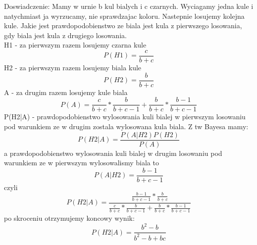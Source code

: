 \medskip
{} 
\medskip

Doswiadczenie: Mamy w urnie b kul bialych i c czarnych. Wyciagamy jedna kule i natychmiast ja wyrzucamy, nie sprawdzajac koloru. Nastepnie losujemy kolejna kule. Jakie jest prawdopodobienstwo ze biala jest kula z pierwszego losowania, gdy biala jest kula z drugiego losowania.  
$$
$$
H1 - za pierwszym razem losujemy czarna kule
$$
P(H1) = \frac{c}{b+c}
$$
H2 - za pierwszym razem losujemy biala kule
$$
P(H2) = \frac{b}{b+c}
$$
A -  za drugim razem losujemy kule biala
$$
P(A) = \frac{c}{b+c}*\frac{b}{b+c-1} + \frac{b}{b+c}*\frac{b-1}{b+c-1}
$$
P(H2|A) - prawdopodobienstwo wylosowania kuli bialej w pierwszym losowaniu pod warunkiem ze w drugim zostala wylosowana kula biala.
Z tw Bayesa mamy:
$$
P(H2|A) = \frac{P(A|H2)P(H2)}{P(A)}
$$
a prawdopodobienstwo wylosowania kuli bialej w drugim losowaniu pod warunkiem ze w pierwszym wylosowalismy biala to
$$
P(A|H2) = \frac{b-1}{b+c-1}
$$
czyli
$$
P(H2|A) = \frac{ \frac{b-1}{b+c-1} * \frac{b}{b+c} }{ \frac{c}{b+c}*\frac{b}{b+c-1} + \frac{b}{b+c}*\frac{b-1}{b+c-1} }
$$
po skroceniu otrzymujemy koncowy wynik:
$$
P(H2|A) =\frac{ b^{2} - b} {b^{2} - b + bc}
$$
